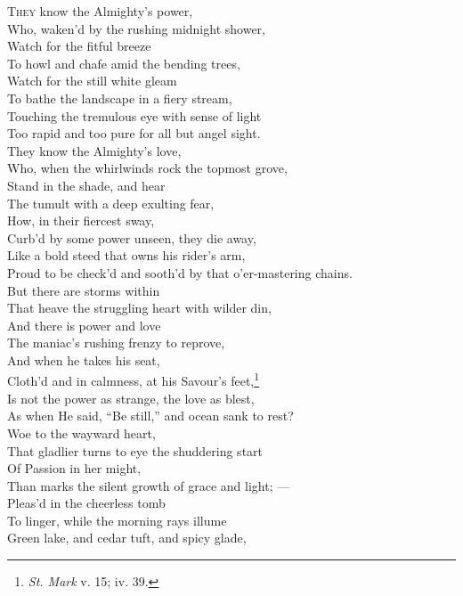 \textsc{They} know the Almighty’s power, \\
 Who, waken’d by the rushing midnight shower, \\
 Watch for the fitful breeze \\
 To howl and chafe amid the bending trees, \\
 Watch for the still white gleam \\
 To bathe the landscape in a fiery stream, \\
 Touching the tremulous eye with sense of light \\
 Too rapid and too pure for all but angel sight. \\
  They know the Almighty’s love, \\
 Who, when the whirlwinds rock the topmost grove, \\
 Stand in the shade, and hear \\
 The tumult with a deep exulting fear, \\
 How, in their fiercest sway, \\
 Curb’d by some power unseen, they die away, \\
 Like a bold steed that owns his rider’s arm, \\
 Proud to be check’d and sooth’d by that o’er-mastering chains. \\
  But there are storms within \\
 That heave the struggling heart with wilder din, \\
 And there is power and love \\
 The maniac’s rushing frenzy to reprove, \\
 And when he takes his seat, \\
 Cloth’d and in calmness, at his Savour’s feet,\footnote{\emph{St. Mark} v. 15; iv. 39.} \\
 Is not the power as strange, the love as blest, \\
 As when He said, “Be still,” and ocean sank to rest? \\
  Woe to the wayward heart, \\
 That gladlier turns to eye the shuddering start \\
 Of Passion in her might, \\
 Than marks the silent growth of grace and light; — \\
 Pleas’d in the cheerless tomb \\
 To linger, while the morning rays illume \\
 Green lake, and cedar tuft, and spicy glade, \\
